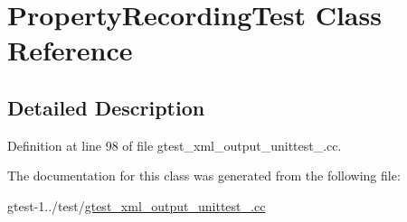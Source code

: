 \hypertarget{classPropertyRecordingTest}{\section{\-Property\-Recording\-Test \-Class \-Reference}
\label{da/d54/classPropertyRecordingTest}
}


\subsection{\-Detailed \-Description}


\-Definition at line 98 of file gtest\-\_\-xml\-\_\-output\-\_\-unittest\-\_\-.\-cc.



\-The documentation for this class was generated from the following file\-:\begin{DoxyCompactItemize}
\item 
gtest-\/1../test/\hyperlink{gtest__xml__output__unittest___8cc}{gtest\-\_\-xml\-\_\-output\-\_\-unittest\-\_\-.\-cc}\end{DoxyCompactItemize}
